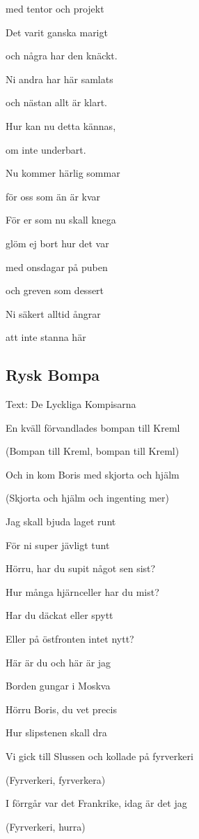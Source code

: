 med tentor och projekt

Det varit ganska marigt

och några har den knäckt.

Ni andra har här samlats

och nästan allt är klart.

Hur kan nu detta kännas,

om inte underbart.\bigskip

Nu kommer härlig sommar

för oss som än är kvar

För er som nu skall knega

glöm ej bort hur det var

med onsdagar på puben

och greven som dessert

Ni säkert alltid ångrar

att inte stanna här 

\subsection{\textbf{Rysk Bompa}}

Text: De Lyckliga Kompisarna\bigskip

En kväll förvandlades bompan till Kreml

(Bompan till Kreml, bompan till Kreml)

Och in kom Boris med skjorta och hjälm

(Skjorta och hjälm och ingenting mer)

Jag skall bjuda laget runt

För ni super jävligt tunt\bigskip


Hörru, har du supit något sen sist?

Hur många hjärnceller har du mist?

Har du däckat eller spytt

Eller på östfronten intet nytt?

Här är du och här är jag

Borden gungar i Moskva

Hörru Boris, du vet precis

Hur slipstenen skall dra\bigskip


Vi gick till Slussen och kollade på fyrverkeri

(Fyrverkeri, fyrverkera)

I förrgår var det Frankrike, idag är det jag

(Fyrverkeri, hurra)

